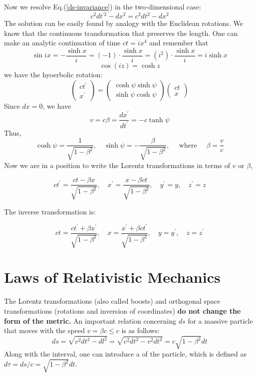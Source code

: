 Now we resolve Eq.(\ref{ds-invariance}) in the two-dimensional case:
$$
c^{2} d t^{\prime 2}-d x^{2}=c^{2} d t^{2}-d x^{2}
$$
The solution can be easily found by analogy with the Euclidean rotations. We know that the continuous transformation that preserves the length. One can make an analytic continuation of time $ct=ix^4$ and remember that 
$$
\sin i x=-\frac{\sinh x}{i}=(-1) \cdot \frac{\sinh x}{i}=\left(i^{2}\right) \cdot \frac{\sinh x}{i}=i \sinh x
$$
$$
\cos (i z)=\cosh z
$$
we have the hyoerbolic rotation:
\begin{equation}
\left(\begin{array}{c}
{c t^{\prime}} \\
{x^{\prime}}
\end{array}\right)=\left(\begin{array}{c}
{\cosh \psi \sinh \psi} \\
{\sinh \psi \cosh \psi}
\end{array}\right)\left(\begin{array}{l}
{c t} \\
{x}
\end{array}\right)
\end{equation}
Since $dx=0$, we have
$$
v=c \beta=\frac{d x^{\prime}}{d t^{\prime}}=-c \tanh \psi
$$
Thus,
$$
\cosh \psi=\frac{1}{\sqrt{1-\beta^{2}}}, \quad \sinh \psi=-\frac{\beta}{\sqrt{1-\beta^{2}}}, \quad \text { where } \quad \beta=\frac{v}{c}
$$
Now we are in a position to write the Lorentz transformations in terms of $v$ or $\beta$,
\begin{qt}
    \begin{equation}
c t^{\prime}=\frac{c t-\beta x}{\sqrt{1-\beta^{2}}}, \quad x^{\prime}=\frac{x-\beta c t}{\sqrt{1-\beta^{2}}}, \quad y^{\prime}=y, \quad z^{\prime}=z
\end{equation}
\end{qt}
The inverse transformation is:
\begin{qt}
    \begin{equation}
c t=\frac{c t^{\prime}+\beta x^{\prime}}{\sqrt{1-\beta^{2}}}, \quad x=\frac{x^{\prime}+\beta c t^{\prime}}{\sqrt{1-\beta^{2}}}, \quad y=y^{\prime}, \quad z=z^{\prime}
\end{equation}
\end{qt}

\section{Laws of Relativistic Mechanics}
The Lorentz transformations (also called boosts) and orthogonal space transformations (rotations and inversion of coordinates) \textbf{do not change the form of the metric.} An important relation concerning $ds$ for a massive particle that moves with the speed $v=\beta c\leq c$ is as follows:
\begin{equation}
d s=\sqrt{c^{2} d t^{2}-d l^{2}}=\sqrt{c^{2} d t^{2}-v^{2} d t^{2}}=c \sqrt{1-\beta^{2}} d t
\end{equation}
Along with the interval, one can introduce a \textbf{} of the particle, which is defined as $d \tau=d s / c=\sqrt{1-\beta^{2}} d t$.

